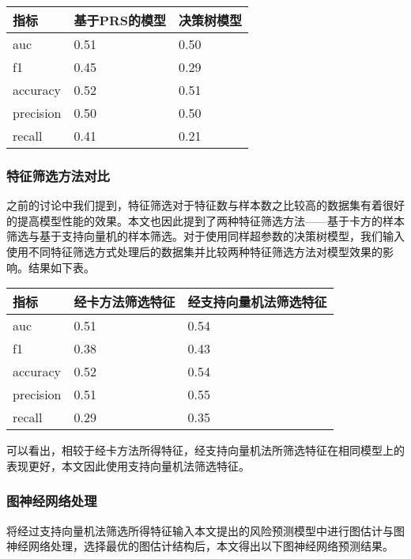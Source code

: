 \documentclass[
]{article}
\begin{document}
\begin{longtable}[]{@{}lll@{}}
\toprule()
指标 & 基于PRS的模型 & 决策树模型 \\
\midrule()
\endhead
auc & 0.51 & 0.50 \\
f1 & 0.45 & 0.29 \\
accuracy & 0.52 & 0.51 \\
precision & 0.50 & 0.50 \\
recall & 0.41 & 0.21 \\
\bottomrule()
\end{longtable}

\hypertarget{ux7279ux5f81ux7b5bux9009ux65b9ux6cd5ux5bf9ux6bd4}{%
\subsubsection{特征筛选方法对比}\label{ux7279ux5f81ux7b5bux9009ux65b9ux6cd5ux5bf9ux6bd4}}

之前的讨论中我们提到，特征筛选对于特征数与样本数之比较高的数据集有着很好的提高模型性能的效果。本文也因此提到了两种特征筛选方法------基于卡方的样本筛选与基于支持向量机的样本筛选。对于使用同样超参数的决策树模型，我们输入使用不同特征筛选方式处理后的数据集并比较两种特征筛选方法对模型效果的影响。结果如下表。

\begin{longtable}[]{@{}lll@{}}
\toprule()
指标 & 经卡方法筛选特征 & 经支持向量机法筛选特征 \\
\midrule()
\endhead
auc & 0.51 & 0.54 \\
f1 & 0.38 & 0.43 \\
accuracy & 0.52 & 0.54 \\
precision & 0.51 & 0.55 \\
recall & 0.29 & 0.35 \\
\bottomrule()
\end{longtable}

可以看出，相较于经卡方法所得特征，经支持向量机法所筛选特征在相同模型上的表现更好，本文因此使用支持向量机法筛选特征。

\hypertarget{ux56feux795eux7ecfux7f51ux7edcux5904ux7406}{%
\subsubsection{图神经网络处理}\label{ux56feux795eux7ecfux7f51ux7edcux5904ux7406}}

将经过支持向量机法筛选所得特征输入本文提出的风险预测模型中进行图估计与图神经网络处理，选择最优的图估计结构后，本文得出以下图神经网络预测结果。
\end{document}
